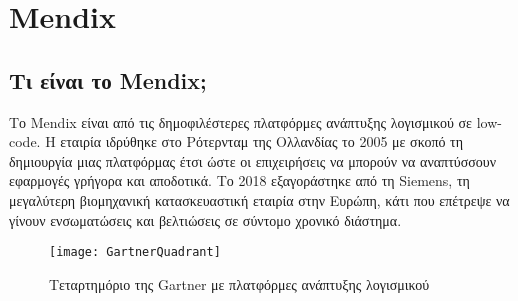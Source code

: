 \chapter{Mendix}

    \section{Τι είναι το Mendix;}
        Το Mendix είναι από τις δημοφιλέστερες πλατφόρμες ανάπτυξης λογισμικού σε low-code. Η εταιρία ιδρύθηκε στο Ρότερνταμ της Ολλανδίας το 2005 με σκοπό τη δημιουργία μιας πλατφόρμας έτσι ώστε οι επιχειρήσεις να μπορούν να αναπτύσσουν εφαρμογές γρήγορα και αποδοτικά. Το 2018 εξαγοράστηκε από τη Siemens, τη μεγαλύτερη βιομηχανική κατασκευαστική εταιρία στην Ευρώπη, κάτι που επέτρεψε να γίνουν ενσωματώσεις και βελτιώσεις σε σύντομο χρονικό διάστημα.

            \begin{figure}[h!] \noindent \centering
                    \texttt{[image: GartnerQuadrant]}
                    \caption{\centering Τεταρτημόριο της Gartner με πλατφόρμες ανάπτυξης λογισμικού \cite{mendixGartnerQuadrant}}
            \end{figure}

        \cite{LowCodeMendix}
